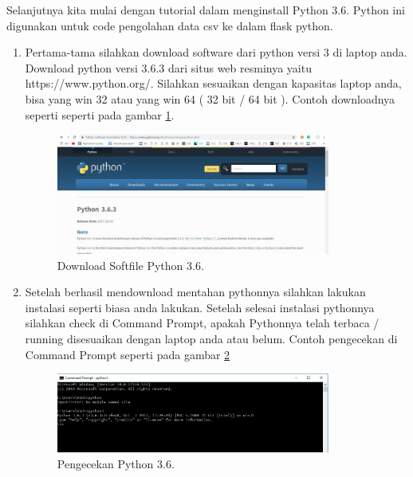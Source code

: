 Selanjutnya kita mulai dengan tutorial dalam menginstall Python 3.6. Python ini digunakan untuk code pengolahan data csv ke dalam flask python.
\begin{enumerate}
\item Pertama-tama silahkan download software dari python versi 3 di laptop anda. Download python versi 3.6.3 dari situs web resminya yaitu https://www.python.org/. Silahkan sesuaikan dengan kapasitas laptop anda, bisa yang win 32 atau yang win 64 ( 32 bit / 64 bit ). Contoh downloadnya seperti seperti pada gambar \ref{fig:python36}.
\begin{figure}[!htbp]
	\centerline{\includegraphics[width=0.85\textwidth]{figures/8/python36.jpg}}
	\caption{Download Softfile Python 3.6.}
	\label{fig:python36}
\end{figure}
 
\item Setelah berhasil mendownload mentahan pythonnya silahkan lakukan instalasi seperti biasa anda lakukan. Setelah selesai instalasi pythonnya silahkan check di Command Prompt, apakah Pythonnya telah terbaca / running disesuaikan dengan laptop anda atau belum. Contoh pengecekan di Command Prompt seperti pada gambar \ref{fig:cek_python36}
\begin{figure}[!htbp]
	\centerline{\includegraphics[width=0.85\textwidth]{figures/8/cek_python36.jpg}}
	\caption{Pengecekan Python 3.6.}
	\label{fig:cek_python36}
\end{figure}


\end{enumerate}
